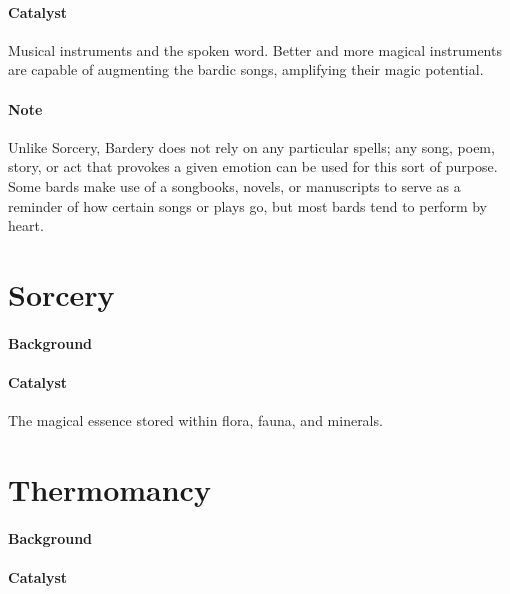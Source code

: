 \paragraph{Catalyst} Musical instruments and the spoken word.
Better and more magical instruments are capable of augmenting the bardic songs, amplifying their magic potential.

\paragraph{Note} Unlike Sorcery, Bardery does not rely on any particular spells; 
any song, poem, story, or act that provokes a given emotion can be used for this sort of purpose.
Some bards make use of a songbooks, novels, or manuscripts to serve as a reminder of how certain songs or plays go, but most bards tend to perform by heart.

\section{Sorcery}

\paragraph{Background}

\paragraph{Catalyst} The magical essence stored within flora, fauna, and minerals.

\section{Thermomancy}

\paragraph{Background}

\paragraph{Catalyst}